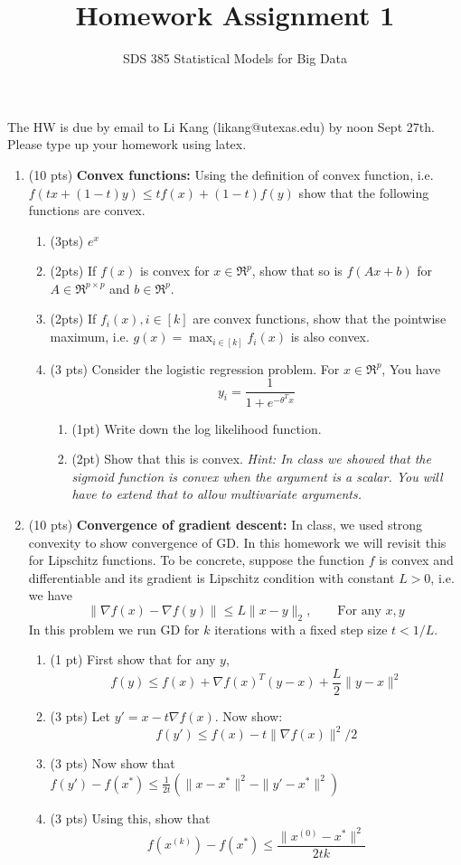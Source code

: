 \documentclass[11pt]{article}
\newcommand{\bi}{\begin{enumerate}}
\newcommand{\ib}{\end{enumerate}}
\newcommand{\p}{\item}
\begin{document}
\title{{\bf Homework Assignment 1}}
\author{SDS 385 Statistical Models for Big Data}

\date{}

\maketitle{}
The HW is due by email to Li Kang (likang@utexas.edu) by noon Sept 27th. Please type up your homework using latex. 
\begin{enumerate}%
\item (10 pts) \textbf{Convex functions: } Using the definition of convex function, i.e. $f(tx+(1-t)y)\leq tf(x)+(1-t)f(y)$ show that the following functions are convex.
\bi
\p (3pts) $e^x$
\p (2pts) If $f(x)$ is convex for $x\in\Re^p$, show that so is $f(Ax+b)$ for $A\in \Re^{p\times p}$ and $b\in \Re^p$.
\p (2pts) If $f_i(x),i\in[k]$ are convex functions, show that the pointwise maximum, i.e. $g(x)=\max_{i\in[k]}f_i(x)$ is also convex.
\p (3 pts) Consider the logistic regression problem. For $x\in \Re^p$, You have
$$y_i=\frac{1}{1+e^{-\theta^T x}}$$

\bi
\p (1pt) Write down the log likelihood function.
\p (2pt) Show that this is convex.
\textit{Hint: In class we showed that the sigmoid function is convex when the argument is a scalar. You will have to extend that to allow multivariate arguments.}
\ib

\ib
\item (10 pts) \textbf{Convergence of gradient descent:} In class, we used strong convexity to show convergence of GD. In this homework we will revisit this for Lipschitz functions. To be concrete, suppose the function $f$ is convex and differentiable and its gradient is Lipschitz condition with constant $L>0$, i.e. we have 
$$\|\nabla f(x)-\nabla f(y)\|\leq L\|x-y\|_2, \qquad \mbox{For any $x,y$}$$
In this problem we run GD for $k$ iterations with a fixed step size $t<1/L$.
\begin{enumerate} 
	\item (1 pt) First show that for any $y$,
	$$f(y)\leq f(x)+\nabla f(x)^T(y-x)+\frac{L}{2}\|y-x\|^2$$
	\item (3 pts) Let $y'=x-t\nabla f(x)$. Now show:
	$$f(y')\leq f(x)-t\|\nabla f(x)\|^2/2$$
	\item (3 pts) Now show that $f(y')-f(x^*)\leq \frac{1}{2t}(\|x-x^*\|^2-\|y'-x^*\|^2)$
	\item (3 pts) Using this, show that $$f(x^{(k)})-f(x^*)\leq \frac{\|x^{(0)}-x^*\|^2}{2tk}$$
\end{enumerate}


\end{enumerate}
\end{document}
